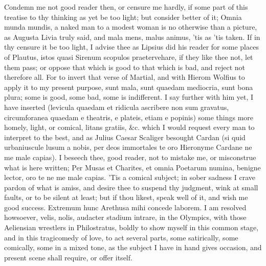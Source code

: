 {Condemn me not good reader then, or censure me hardly, if some part of
this treatise to thy thinking as yet be too light; but consider better
of it; Omnia munda mundis, a naked man to a modest woman is no
otherwise than a picture, as Augusta Livia truly said, and mala
mens, malus animus, 'tis as 'tis taken. If in thy censure it be too
light, I advise thee as Lipsius did his reader for some places of
Plautus, istos quasi Sirenum scopulos praetervehare, if they like thee
not, let them pass; or oppose that which is good to that which is bad,
and reject not therefore all. For to invert that verse of Martial, and
with Hierom Wolfius to apply it to my present purpose, sunt mala, sunt
quaedam mediocria, sunt bona plura; some is good, some bad, some is
indifferent. I say further with him yet, I have inserted
(levicula quaedam et ridicula ascribere non sum gravatus,
circumforanea quaedam e theatris, e plateis, etiam e popinis) some
things more homely, light, or comical, litans gratiis, \&c. which I
would request every man to interpret to the best, and as Julius Caesar
Scaliger besought Cardan (si quid urbaniuscule lusum a nobis, per deos
immortales te oro Hieronyme Cardane ne me male capias). I beseech thee,
good reader, not to mistake me, or misconstrue what is here written;
Per Musas et Charites, et omnia Poetarum numina, benigne lector, oro te
ne me male capias. 'Tis a comical subject; in sober sadness I crave
pardon of what is amiss, and desire thee to suspend thy judgment, wink
at small faults, or to be silent at least; but if thou likest, speak
well of it, and wish me good success. Extremum hunc Arethusa mihi
concede laborem.
I am resolved howsoever, velis, nolis, audacter stadium intrare, in the
Olympics, with those Aeliensian wrestlers in Philostratus, boldly to
show myself in this common stage, and in this tragicomedy of love, to
act several parts, some satirically, some comically, some in a mixed
tone, as the subject I have in hand gives occasion, and present scene
shall require, or offer itself.

}
